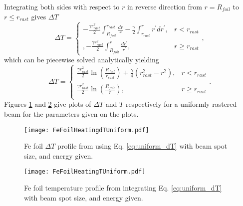 \documentclass[12pt]{article}
\begin{document}
Integrating both sides with respect to $r$ in reverse direction from $r=R_{foil}$ to $r\leq r_{rast}$ gives $\Delta T$ 
\[
\Delta T=
\begin{cases}
-\frac{\gamma r_{rast}^2}{2}\int_{R_{foil}}^{r_{rast}}\frac{dr}{r}-\frac{\gamma}{2}\int_{r_{rast}}^r r^\prime dr^\prime,& r<r_{rast}\\,
-\frac{\gamma r_{rast}^2}{2}\int_{R_{foil}}^{r}\frac{dr^\prime}{r^\prime},& r\geq r_{rast}

\end{cases},
\]
which can be piecewise solved analytically yielding
\begin{equation}
\label{eq:uniform_dT}
\Delta T = 
\begin{cases}
\frac{\gamma r_{rast}^2}{2}\ln{\left(\frac{R_{foil}}{r_{rast}}\right)}+\frac{\gamma}{4}\left(r_{rast}^2-r^2\right),& r <r_{rast}\\
\frac{\gamma r_{rast}^2}{2}\ln{\left(\frac{R_{foil}}{r}\right)},& r \geq r_{rast}\\

\end{cases}.
\end{equation}
Figures \ref{fig:foilheating_uni} and \ref{fig:foilheatingT_uni} give plots of $\Delta T$ and $T$ respectively for a uniformly rastered beam for the parameters given on the plots.

\begin{figure}[h]
\centering
\texttt{[image: FeFoilHeatingdTUniform.pdf]}
\caption{\label{fig:foilheating_uni}Fe foil $\Delta T$ profile from using Eq. \ref{eq:uniform_dT} with beam spot size, and energy given.}
\end{figure}
\begin{figure}[h]
\centering
\texttt{[image: FeFoilHeatingTUniform.pdf]}
\caption{\label{fig:foilheatingT_uni}Fe foil temperature profile from integrating Eq. \ref{eq:uniform_dT} with beam spot size, and energy given.}
\end{figure}

\clearpage
\end{document}
